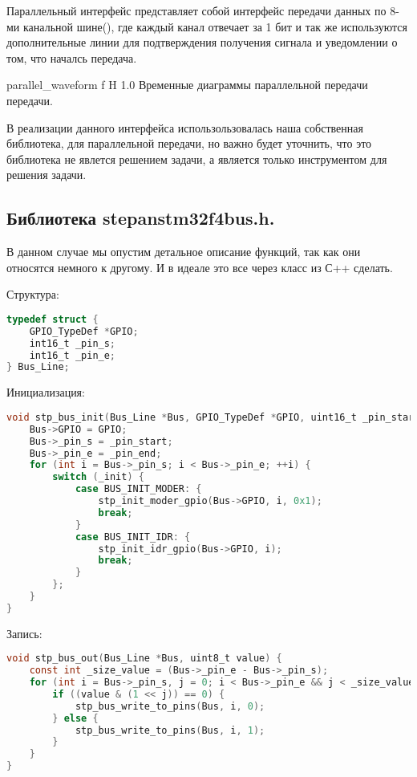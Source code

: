 \documentclass{bmstu}
\begin{document}
	Параллельный интерфейс представляет собой интерфейс передачи данных по 8-ми канальной шине(), где каждый канал отвечает за 1 бит и так же используются дополнительные линии для подтверждения получения сигнала и уведомлении о том, что началсь передача.
	
	{parallel_waveform} %
	{f} %
	{H} %
	{1.0\textwidth} %
	{Временные диаграммы параллельной передачи передачи.}
	
	В реализации данного интерфейса использользовалась наша собственная библиотека, для параллельной передачи, но важно будет уточнить, что это библиотека не явлется решением задачи, а является только инструментом для решения задачи.
	
	\subsection{Библиотека stepan\textunderscore stm32f4\textunderscore bus.h.}
	
	В данном случае мы опустим детальное описание функций, так как они относятся немного к другому. И в идеале это все через класс из С++ сделать.
	
	Структура:
	
	\begingroup
	\fontsize{12pt}{12pt}\selectfont
	\begin{lstlisting}[language=C]
typedef struct {
	GPIO_TypeDef *GPIO;
	int16_t _pin_s;
	int16_t _pin_e;
} Bus_Line;	
	\end{lstlisting}
	\endgroup
	
	Инициализация:
	
	\begingroup
	\fontsize{12pt}{12pt}\selectfont
	\begin{lstlisting}[language=C]
void stp_bus_init(Bus_Line *Bus, GPIO_TypeDef *GPIO, uint16_t _pin_start, uint16_t _pin_end, uint8_t _init) {
	Bus->GPIO = GPIO;
	Bus->_pin_s = _pin_start;
	Bus->_pin_e = _pin_end;
	for (int i = Bus->_pin_s; i < Bus->_pin_e; ++i) {
		switch (_init) {
			case BUS_INIT_MODER: {
				stp_init_moder_gpio(Bus->GPIO, i, 0x1);
				break;
			}
			case BUS_INIT_IDR: {
				stp_init_idr_gpio(Bus->GPIO, i);
				break;
			}
		};
	}
}
	\end{lstlisting}
	\endgroup
	
	Запись:
	
	\begingroup
	\fontsize{12pt}{12pt}\selectfont
	\begin{lstlisting}[language=C]
void stp_bus_out(Bus_Line *Bus, uint8_t value) {
	const int _size_value = (Bus->_pin_e - Bus->_pin_s);
	for (int i = Bus->_pin_s, j = 0; i < Bus->_pin_e && j < _size_value; ++i, ++j) {
		if ((value & (1 << j)) == 0) {
			stp_bus_write_to_pins(Bus, i, 0);
		} else {
			stp_bus_write_to_pins(Bus, i, 1);
		}
	}
}	
	\end{lstlisting}
	\endgroup
	
\end{document}
